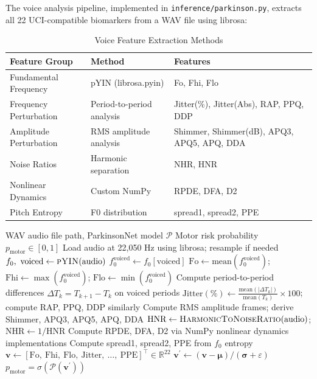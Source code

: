 The voice analysis pipeline, implemented in \texttt{inference/parkinson.py}, extracts all 22 UCI-compatible biomarkers from a WAV file using librosa:

\begin{table}[h!]
\centering
\caption{Voice Feature Extraction Methods}
\renewcommand{\arraystretch}{1.3}
\begin{tabular}{|l|l|>{\raggedright\arraybackslash}p{6.5cm}|}
\hline
\textbf{Feature Group} & \textbf{Method} & \textbf{Features} \\
\hline
Fundamental Frequency & pYIN (librosa.pyin) & Fo, Fhi, Flo \\
Frequency Perturbation & Period-to-period analysis & Jitter(\%), Jitter(Abs), RAP, PPQ, DDP \\
Amplitude Perturbation & RMS amplitude analysis & Shimmer, Shimmer(dB), APQ3, APQ5, APQ, DDA \\
Noise Ratios & Harmonic separation & NHR, HNR \\
Nonlinear Dynamics & Custom NumPy & RPDE, DFA, D2 \\
Pitch Entropy & F0 distribution & spread1, spread2, PPE \\
\hline
\end{tabular}
\end{table}

\begin{algorithm}
\caption{Voice Feature Extraction Pipeline (ParkinsonNet)}\label{alg:voice}
\begin{algorithmic}
    \Require WAV audio file path, ParkinsonNet model $\mathcal{P}$
    \Ensure Motor risk probability $p_{\text{motor}} \in [0, 1]$
    \State Load audio at 22{,}050 Hz using librosa; resample if needed
    \State $f_0,\ \text{voiced} \gets \textsc{pYIN}(\text{audio})$ 
    \State $f_0^{\text{voiced}} \gets f_0[\text{voiced}]$ 
    \State $\text{Fo} \gets \text{mean}(f_0^{\text{voiced}})$; $\text{Fhi} \gets \max(f_0^{\text{voiced}})$; $\text{Flo} \gets \min(f_0^{\text{voiced}})$
    \State Compute period-to-period differences $\Delta T_k = T_{k+1} - T_k$ on voiced periods
    \State $\text{Jitter}(\%) \gets \frac{\text{mean}(|\Delta T_k|)}{\text{mean}(T_k)} \times 100$; compute RAP, PPQ, DDP similarly
    \State Compute RMS amplitude frames; derive Shimmer, APQ3, APQ5, APQ, DDA
    \State $\text{HNR} \gets \textsc{HarmonicToNoiseRatio}(\text{audio})$; $\text{NHR} \gets 1/\text{HNR}$
    \State Compute RPDE, DFA, D2 via NumPy nonlinear dynamics implementations
    \State Compute spread1, spread2, PPE from $f_0$ entropy
    \State $\mathbf{v} \gets [\text{Fo},\ \text{Fhi},\ \text{Flo},\ \text{Jitter},\ \ldots,\ \text{PPE}]^\top \in \mathbb{R}^{22}$
    \State $\mathbf{v}^{\prime} \gets (\mathbf{v} - \boldsymbol{\mu}) / (\boldsymbol{\sigma} + \varepsilon)$ 
    \State \Return $p_{\text{motor}} = \sigma(\mathcal{P}(\mathbf{v}^{\prime}))$
\end{algorithmic}
\end{algorithm}

